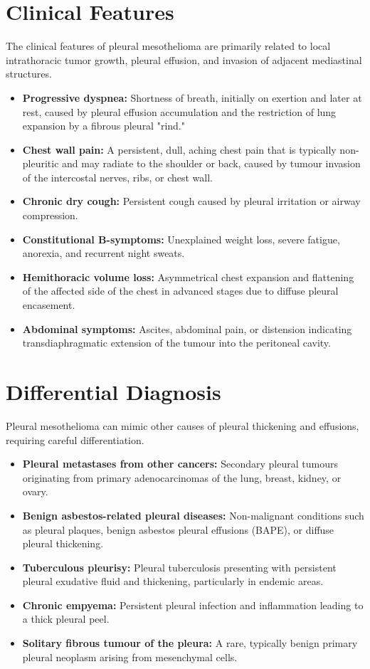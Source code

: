 \section*{Clinical Features}
The clinical features of pleural mesothelioma are primarily related to local intrathoracic tumor growth, pleural effusion, and invasion of adjacent mediastinal structures.
\begin{itemize}
    \item \textbf{Progressive dyspnea:} Shortness of breath, initially on exertion and later at rest, caused by pleural effusion accumulation and the restriction of lung expansion by a fibrous pleural "rind."
    \item \textbf{Chest wall pain:} A persistent, dull, aching chest pain that is typically non-pleuritic and may radiate to the shoulder or back, caused by tumour invasion of the intercostal nerves, ribs, or chest wall.
    \item \textbf{Chronic dry cough:} Persistent cough caused by pleural irritation or airway compression.
    \item \textbf{Constitutional B-symptoms:} Unexplained weight loss, severe fatigue, anorexia, and recurrent night sweats.
    \item \textbf{Hemithoracic volume loss:} Asymmetrical chest expansion and flattening of the affected side of the chest in advanced stages due to diffuse pleural encasement.
    \item \textbf{Abdominal symptoms:} Ascites, abdominal pain, or distension indicating transdiaphragmatic extension of the tumour into the peritoneal cavity.
\end{itemize}

\section*{Differential Diagnosis}
Pleural mesothelioma can mimic other causes of pleural thickening and effusions, requiring careful differentiation.
\begin{itemize}
    \item \textbf{Pleural metastases from other cancers:} Secondary pleural tumours originating from primary adenocarcinomas of the lung, breast, kidney, or ovary.
    \item \textbf{Benign asbestos-related pleural diseases:} Non-malignant conditions such as pleural plaques, benign asbestos pleural effusions (BAPE), or diffuse pleural thickening.
    \item \textbf{Tuberculous pleurisy:} Pleural tuberculosis presenting with persistent pleural exudative fluid and thickening, particularly in endemic areas.
    \item \textbf{Chronic empyema:} Persistent pleural infection and inflammation leading to a thick pleural peel.
    \item \textbf{Solitary fibrous tumour of the pleura:} A rare, typically benign primary pleural neoplasm arising from mesenchymal cells.
\end{itemize}

